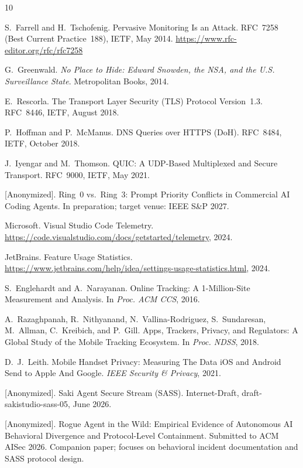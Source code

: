 \documentclass[sigconf,anonymous]{acmart}
\begin{document}
\begin{thebibliography}{10}

S.~Farrell and H.~Tschofenig.
\newblock Pervasive Monitoring Is an Attack.
\newblock RFC~7258 (Best Current Practice~188), IETF, May 2014.
\newblock \url{https://www.rfc-editor.org/rfc/rfc7258}

G.~Greenwald.
\newblock \emph{No Place to Hide: Edward Snowden, the NSA, and the U.S.
  Surveillance State}.
\newblock Metropolitan Books, 2014.

E.~Rescorla.
\newblock The Transport Layer Security (TLS) Protocol Version~1.3.
\newblock RFC~8446, IETF, August 2018.

P.~Hoffman and P.~McManus.
\newblock DNS Queries over HTTPS (DoH).
\newblock RFC~8484, IETF, October 2018.

J.~Iyengar and M.~Thomson.
\newblock QUIC: A UDP-Based Multiplexed and Secure Transport.
\newblock RFC~9000, IETF, May 2021.

[Anonymized].
\newblock Ring~0 vs.\ Ring~3: Prompt Priority Conflicts in Commercial AI
  Coding Agents.
\newblock In preparation; target venue: IEEE S\&P 2027.

Microsoft.
\newblock Visual Studio Code Telemetry.
\newblock \url{https://code.visualstudio.com/docs/getstarted/telemetry}, 2024.

JetBrains.
\newblock Feature Usage Statistics.
\newblock \url{https://www.jetbrains.com/help/idea/settings-usage-statistics.html}, 2024.

S.~Englehardt and A.~Narayanan.
\newblock Online Tracking: A 1-Million-Site Measurement and Analysis.
\newblock In \emph{Proc. ACM CCS}, 2016.

A.~Razaghpanah, R.~Nithyanand, N.~Vallina-Rodriguez, S.~Sundaresan,
  M.~Allman, C.~Kreibich, and P.~Gill.
\newblock Apps, Trackers, Privacy, and Regulators: A Global Study of the
  Mobile Tracking Ecosystem.
\newblock In \emph{Proc. NDSS}, 2018.

D.~J.~Leith.
\newblock Mobile Handset Privacy: Measuring The Data iOS and Android Send
  to Apple And Google.
\newblock \emph{IEEE Security \& Privacy}, 2021.

[Anonymized].
\newblock Saki Agent Secure Stream (SASS).
\newblock Internet-Draft, draft-sakistudio-sass-05, June 2026.

[Anonymized].
\newblock Rogue Agent in the Wild: Empirical Evidence of Autonomous AI
  Behavioral Divergence and Protocol-Level Containment.
\newblock Submitted to ACM AISec 2026.
\newblock Companion paper; focuses on behavioral incident documentation and
  SASS protocol design.

\end{thebibliography}
\end{document}

